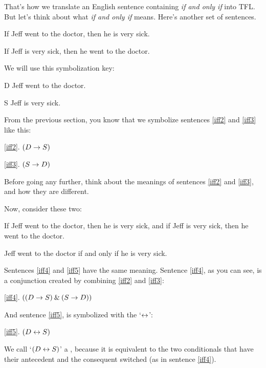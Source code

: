 That's how we translate an English sentence containing \textit{if and only if} into TFL. But let's think about what \textit{if and only if} means. Here's another set of sentences.
	\begin{earg}
		\item[\ex{iff2}] If Jeff went to the doctor, then he is very sick.
		\item[\ex{iff3}] If Jeff is very sick, then he went to the doctor. 
	\end{earg}
We will use this symbolization key:
	\begin{ekey}
		\item[D] Jeff went to the doctor.
		\item[S] Jeff is very sick.
	\end{ekey}
	
From the previous section, you know that we symbolize sentences \ref{iff2} and \ref{iff3} like this:
	\begin{earg}
		\item[\ref{iff2}.] $(D \rightarrow S)$
		\item[\ref{iff3}.] $(S \rightarrow D)$ 
	\end{earg}
Before going any further, think about the meanings of sentences \ref{iff2} and \ref{iff3}, and how they are different. 

Now, consider these two:
\begin{earg}
\item[\ex{iff4}] If Jeff went to the doctor, then he is very sick, and if Jeff is very sick, then he went to the doctor.
\item[\ex{iff5}] Jeff went to the doctor if and only if he is very sick.
\end{earg}
Sentences \ref{iff4} and \ref{iff5} have the same meaning. Sentence \ref{iff4}, as you can see, is a conjunction created by combining \ref{iff2} and \ref{iff3}: 
	\begin{earg}
		\item[\ref{iff4}.] $((D \rightarrow S) \mathbin{\&} (S \rightarrow D))$
 	\end{earg}
And sentence \ref{iff5}, is symbolized with the `$\leftrightarrow$':
	\begin{earg}
		\item[\ref{iff5}.] $(D \leftrightarrow S)$
	\end{earg}

We call `$(D \leftrightarrow S)$' a , because it is equivalent to the two conditionals that have their antecedent and the consequent switched (as in sentence \ref{iff4}).

